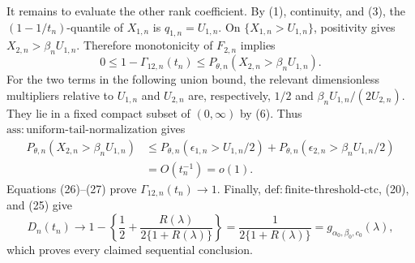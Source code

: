 It remains to evaluate the other rank coefficient.  By (1), continuity, and (3), the \((1-1/t_n)\)-quantile of \(X_{1,n}\) is \(q_{1,n}=U_{1,n}\).  On \(\{X_{1,n}>U_{1,n}\}\), positivity gives \(X_{2,n}>\beta_nU_{1,n}\).  Therefore monotonicity of \(F_{2,n}\) implies
\[
0\leq1-\Gamma_{12,n}(t_n)
\leq P_{\theta,n}(X_{2,n}>\beta_nU_{1,n}).
\tag{26}
\]
For the two terms in the following union bound, the relevant dimensionless multipliers relative to \(U_{1,n}\) and \(U_{2,n}\) are, respectively, \(1/2\) and \(\beta_nU_{1,n}/(2U_{2,n})\).  They lie in a fixed compact subset of \((0,\infty)\) by (6).  Thus \(\mathrm{ass{:}uniform\text{-}tail\text{-}normalization}\) gives
\[
\begin{split}
P_{\theta,n}(X_{2,n}>\beta_nU_{1,n})
&\leq P_{\theta,n}(\epsilon_{1,n}>U_{1,n}/2)
+P_{\theta,n}(\epsilon_{2,n}>\beta_nU_{1,n}/2)\\
&=O(t_n^{-1})=o(1).
\end{split}
\tag{27}
\]
Equations (26)--(27) prove \(\Gamma_{12,n}(t_n)\to1\).  Finally, \(\mathrm{def{:}finite\text{-}threshold\text{-}ctc}\), (20), and (25) give
\[
D_n(t_n)\longrightarrow
1-\left\{\frac12+\frac{R(\lambda)}{2\{1+R(\lambda)\}}\right\}
=\frac1{2\{1+R(\lambda)\}}
=g_{\alpha_0,\beta_0,c_0}(\lambda),
\]
which proves every claimed sequential conclusion.